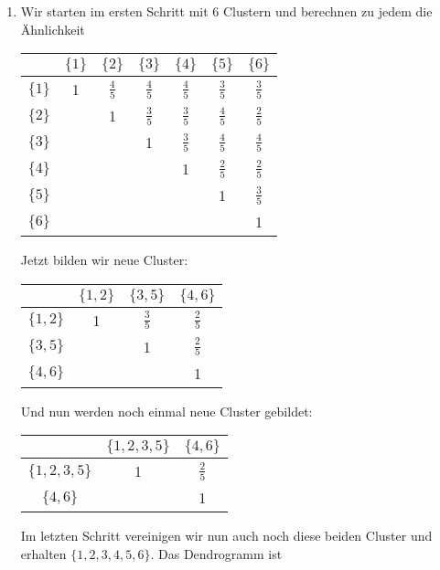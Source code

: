 \documentclass{article}
\begin{document}
	\begin{enumerate}[label=(\alph*)]
		\item Wir starten im ersten Schritt mit 6 Clustern und berechnen zu jedem die Ähnlichkeit
		\begin{center}
			\begin{tabular}{c|cccccc}
				& $\{1\}$ & $\{2\}$ & $\{3\}$ & $\{4\}$ & $\{5\}$ & $\{6\}$ \\
				\hline
				$\{1\}$ & 1 & $\frac{4}{5}$ & $\frac{4}{5}$ & $\frac{4}{5}$ & $\frac{3}{5}$ & $\frac{3}{5}$ \\
				$\{2\}$ & & 1 & $\frac{3}{5}$ & $\frac{3}{5}$ & $\frac{4}{5}$ & $\frac{2}{5}$ \\
				$\{3\}$ & & & 1 & $\frac{3}{5}$ & $\frac{4}{5}$ & $\frac{4}{5}$ \\
				$\{4\}$ & & & & 1 & $\frac{2}{5}$ & $\frac{2}{5}$ \\
				$\{5\}$ & & & & & 1 & $\frac{3}{5}$ \\
				$\{6\}$ & & & & & & 1
			\end{tabular}
		\end{center}
		Jetzt bilden wir neue Cluster:
		\begin{center}
			\begin{tabular}{c|ccc}
				& $\{1,2\}$ & $\{3,5\}$ & $\{4,6\}$ \\
				\hline
				$\{1,2\}$ & 1 & $\frac{3}{5}$ & $\frac{2}{5}$ \\
				$\{3,5\}$ & & 1 & $\frac{2}{5}$ \\
				$\{4,6\}$ & & & 1
			\end{tabular}
		\end{center}
		Und nun werden noch einmal neue Cluster gebildet:
		\begin{center}
			\begin{tabular}{c|cc}
				& $\{1,2,3,5\}$ & $\{4,6\}$ \\
				\hline
				$\{1,2,3,5\}$ & 1 & $\frac{2}{5}$ \\
				$\{4,6\}$ & & 1
			\end{tabular}
		\end{center}
		Im letzten Schritt vereinigen wir nun auch noch diese beiden Cluster und erhalten $\{1,2,3,4,5,6\}$. Das Dendrogramm ist
		\begin{center}
\end{center}
\end{enumerate}
\end{document}
